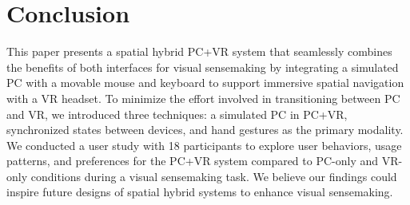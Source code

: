 \section{Conclusion}
\label{sec:conclusion}


This paper presents a spatial hybrid PC+VR system that seamlessly combines the benefits of both interfaces for visual sensemaking by integrating a simulated PC with a movable mouse and keyboard to support immersive spatial navigation with a VR headset. 
To minimize the effort involved in transitioning between PC and VR, we introduced three techniques: a simulated PC in PC+VR, synchronized states between devices, and hand gestures as the primary modality. 
We conducted a user study with 18 participants to explore user behaviors, usage patterns, and preferences for the PC+VR system compared to PC-only and VR-only conditions during a visual sensemaking task.
We believe our findings could inspire future designs of spatial hybrid systems to enhance visual sensemaking.

